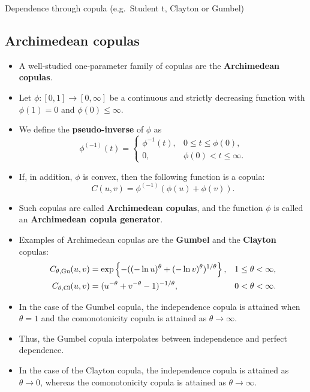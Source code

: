 
Dependence through copula (e.g.\ Student t, Clayton or Gumbel)

\subsection{Archimedean copulas}
\label{sec:archimedean-copulas}

\begin{itemize}
\item A well-studied one-parameter family of copulas are the {\bf 
    Archimedean copulas}. 
\item Let $\phi:[0,1]\rightarrow[0,\infty]$ be a
  continuous and strictly decreasing function with $\phi(1)=0$ and
  $\phi(0)\leq\infty$.
\item  We define the {\bf pseudo-inverse} of $\phi$ as 
  \begin{equation*}
    \phi^{(-1)}(t)=
    \begin{cases}
      \phi^{-1}(t), &0\leq t\leq \phi(0),\\
      0, &\phi(0)<t\leq\infty.
    \end{cases}
  \end{equation*}
\item If, in addition, $\phi$ is convex, then the following function
  is a copula: 
  \begin{equation*}
    C(u,v)=\phi^{(-1)}(\phi(u)+\phi(v)).
  \end{equation*}
  \vspace*{-\baselineskip}
\item Such copulas are called {\bf Archimedean copulas}, and the
  function $\phi$ is called an {\bf Archimedean copula generator}. 
\item Examples of Archimedean copulas are the {\bf Gumbel} and the
  {\bf Clayton} copulas:
  \begin{align*}
    C_{\theta,{\rm Gu}}(u,v) &= \exp\left\{-((-\ln u)^\theta + (-\ln
                               v)^\theta)^{1/\theta}\right\},& 1\leq \theta<\infty,\\
    C_{\theta,{\rm Cl}}(u,v)&= (u^{-\theta} + v^{-\theta}
                              -1)^{-1/\theta}, & 0<\theta<\infty. 
  \end{align*}
\item In the case of the Gumbel copula, the independence copula is 
  attained when $\theta=1$ and the comonotonicity copula is attained
  as $\theta\rightarrow\infty$. 
\item Thus, the Gumbel copula interpolates between independence and
  perfect dependence.  
\item In the case of the Clayton copula, the independence copula is
  attained as $\theta\rightarrow 0$, whereas the comonotonicity
  copula is attained as $\theta\rightarrow\infty$. 
\end{itemize}

